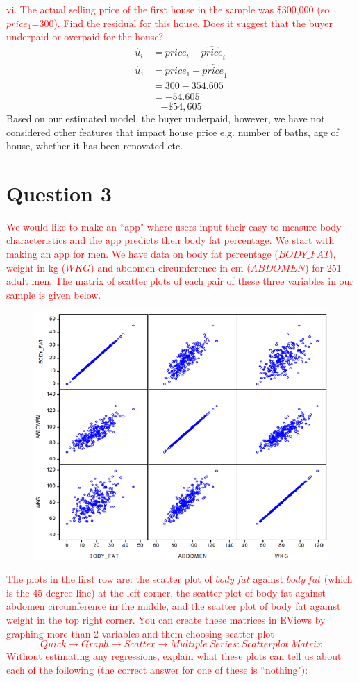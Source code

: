\documentclass[12pt]{report}
\begin{document}
\noindent \textcolor{red}
{
	vi. The actual selling price of the first house in the sample was \$300,000 (so $price_1$=300). Find the residual for this house. Does it suggest that the buyer underpaid or overpaid for the house?
}
\begin{align*}
\hat{u}_i &= price_i - \widehat{price}_i \\
\hat{u}_1 &= price_1 - \widehat{price}_1 \\
&= 300 - 354.605 \\
&= -54.605
\end{align*}
$$-\$54,605$$
\noindent Based on our estimated model, the buyer underpaid, however, we have not considered other features that impact house price e.g. number of baths, age of house, whether it has been renovated etc.

\newpage
\section*{Question 3}
\noindent \textcolor{red}{We would like to make an ``app" where users input their easy to measure body characteristics and the app predicts their body fat percentage. We start with making an app for men. We have data on body fat percentage ($BODY\_FAT$), weight in kg ($WKG$) and abdomen circumference in cm ($ABDOMEN$) for 251 adult men. The matrix of scatter plots of each pair of these three variables in our sample is given below.}
\begin{figure}[H]
	\centering
	\includegraphics{tute5_28}
\end{figure}
\noindent \textcolor{red}{The plots in the first row are: the scatter plot of $body\ fat$ against $body\ fat$ (which is the 45 degree line) at the left corner, the scatter plot of body fat against abdomen circumference in the middle, and the scatter plot of body fat against weight in the top right corner. You can create these matrices in EViews by graphing more than 2 variables and them choosing scatter plot $$Quick \to Graph \to Scatter \to Multiple\ Series: Scatterplot\ Matrix$$ Without estimating any regressions, explain what these plots can tell us about each of the following (the correct answer for one of these is ``nothing"):}
\end{document}
